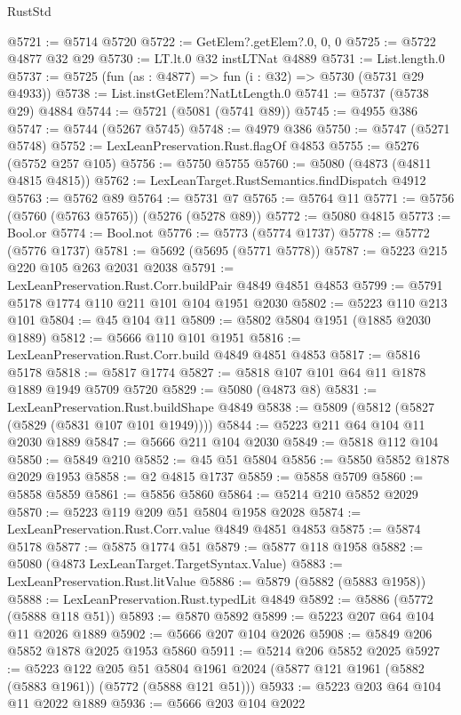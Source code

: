 \begin{lexlean}{RustStd}
\begin{coremodule}
{\begin{coremodule}
{{{{{{{{{{{{{{{{{{{{{{{{{{{{{@5721 := @5714 @5720
@5722 := GetElem?.getElem?.{0, 0, 0}
@5725 := @5722 @4877 @32 @29
@5730 := LT.lt.{0} @32 instLTNat @4889
@5731 := List.length.{0}
@5737 := @5725 (fun (as : @4877) => fun (i : @32) => @5730 (@5731 @29 @4933))
@5738 := List.instGetElem?NatLtLength.{0}
@5741 := @5737 (@5738 @29) @4884
@5744 := @5721 (@5081 (@5741 @89))
@5745 := @4955 @386
@5747 := @5744 (@5267 @5745)
@5748 := @4979 @386
@5750 := @5747 (@5271 @5748)
@5752 := LexLeanPreservation.Rust.flagOf @4853
@5755 := @5276 (@5752 @257 @105)
@5756 := @5750 @5755
@5760 := @5080 (@4873 (@4811 @4815 @4815))
@5762 := LexLeanTarget.RustSemantics.findDispatch @4912
@5763 := @5762 @89
@5764 := @5731 @7
@5765 := @5764 @11
@5771 := @5756 (@5760 (@5763 @5765)) (@5276 (@5278 @89))
@5772 := @5080 @4815
@5773 := Bool.or
@5774 := Bool.not
@5776 := @5773 (@5774 @1737)
@5778 := @5772 (@5776 @1737)
@5781 := @5692 (@5695 (@5771 @5778))
@5787 := @5223 @215 @220 @105 @263 @2031 @2038
@5791 := LexLeanPreservation.Rust.Corr.buildPair @4849 @4851 @4853
@5799 := @5791 @5178 @1774 @110 @211 @101 @104 @1951 @2030
@5802 := @5223 @110 @213 @101
@5804 := @45 @104 @11
@5809 := @5802 @5804 @1951 (@1885 @2030 @1889)
@5812 := @5666 @110 @101 @1951
@5816 := LexLeanPreservation.Rust.Corr.build @4849 @4851 @4853
@5817 := @5816 @5178
@5818 := @5817 @1774
@5827 := @5818 @107 @101 @64 @11 @1878 @1889 @1949 @5709 @5720
@5829 := @5080 (@4873 @8)
@5831 := LexLeanPreservation.Rust.buildShape @4849
@5838 := @5809 (@5812 (@5827 (@5829 (@5831 @107 @101 @1949))))
@5844 := @5223 @211 @64 @104 @11 @2030 @1889
@5847 := @5666 @211 @104 @2030
@5849 := @5818 @112 @104
@5850 := @5849 @210
@5852 := @45 @51 @5804
@5856 := @5850 @5852 @1878 @2029 @1953
@5858 := @2 @4815 @1737
@5859 := @5858 @5709
@5860 := @5858 @5859
@5861 := @5856 @5860
@5864 := @5214 @210 @5852 @2029
@5870 := @5223 @119 @209 @51 @5804 @1958 @2028
@5874 := LexLeanPreservation.Rust.Corr.value @4849 @4851 @4853
@5875 := @5874 @5178
@5877 := @5875 @1774 @51
@5879 := @5877 @118 @1958
@5882 := @5080 (@4873 LexLeanTarget.TargetSyntax.Value)
@5883 := LexLeanPreservation.Rust.litValue
@5886 := @5879 (@5882 (@5883 @1958))
@5888 := LexLeanPreservation.Rust.typedLit @4849
@5892 := @5886 (@5772 (@5888 @118 @51))
@5893 := @5870 @5892
@5899 := @5223 @207 @64 @104 @11 @2026 @1889
@5902 := @5666 @207 @104 @2026
@5908 := @5849 @206 @5852 @1878 @2025 @1953 @5860
@5911 := @5214 @206 @5852 @2025
@5927 := @5223
    @122
    @205
    @51
    @5804
    @1961
    @2024
    (@5877 @121 @1961 (@5882 (@5883 @1961)) (@5772 (@5888 @121 @51)))
@5933 := @5223 @203 @64 @104 @11 @2022 @1889
@5936 := @5666 @203 @104 @2022
}}}}}}}}}}}}}}}}}}}}}}}}}}}}}
\end{coremodule}}
\end{coremodule}
\end{lexlean}
